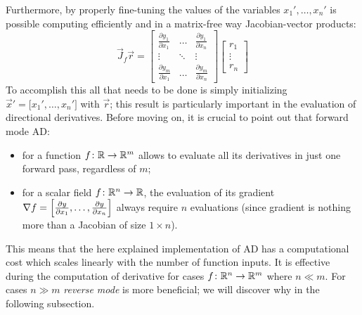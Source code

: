 Furthermore, by properly fine-tuning the values of the variables $x_1', \dots, x_n'$ is possible computing efficiently and in a matrix-free way Jacobian-vector products:
\[
\vec{J}_f \vec{r} =
\begin{bmatrix}
	\frac{\partial y_1}{\partial x_1} &  \dots  & \frac{\partial y_1}{\partial x_n}  \\
	\vdots							  & \ddots  & \vdots							 \\
	\frac{\partial y_m}{\partial x_1} &  \dots  & \frac{\partial y_m}{\partial x_n}
\end{bmatrix}
\begin{bmatrix}
	r_1		\\
	\vdots  \\
	r_n
\end{bmatrix}
\]
To accomplish this all that needs to be done is simply initializing $\vec{x}'=\big[x_1', \dots, x_n' \big]$ with $\vec{r}$; this result is particularly important in the evaluation of directional derivatives.
Before moving on, it is crucial to point out that forward mode AD:
\begin{itemize}
	\item for a function $f \colon \mathbb{R} \to \mathbb{R}^m$ allows to evaluate all its derivatives in just one forward pass, regardless of $m$;
	\item for a scalar field $f \colon \mathbb{R}^n \to \mathbb{R}$, the evaluation of its gradient $\nabla f = \Bigl[ \frac{\partial y}{\partial x_1}, \dots, \frac{\partial y}{\partial x_n} \Bigr]$ always require $n$ evaluations (since gradient is nothing more than a Jacobian of size $1 \times n$).
\end{itemize}
This means that the here explained implementation of AD has a computational cost which scales linearly with the number of function inputs. It is effective during the computation of derivative for cases $f \colon \mathbb{R}^n \to \mathbb{R}^m$ where $n \ll m$. For cases $n \gg m$ \emph{reverse mode} is more beneficial; we will discover why in the following subsection.

